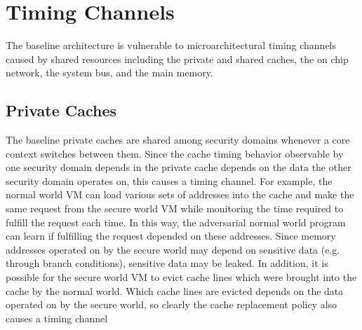 \section{Timing Channels}
The baseline architecture is vulnerable to microarchitectural timing channels 
caused by shared resources including the private and shared caches, the on chip 
network, the system bus, and the main memory.

\subsection{Private Caches}
The baseline private caches are shared among security domains whenever a core 
context switches between them. Since the cache timing behavior observable by 
one security domain depends in the private cache depends on the data the other 
security domain operates on, this causes a timing channel. For example, the 
normal world VM can load various sets of addresses into the cache and make the 
same request from the secure world VM while monitoring the time required to 
fulfill the request each time. In this way, the adversarial normal world 
program can learn if fulfilling the request depended on these addresses. Since 
memory addresses operated on by the secure world may depend on sensitive data 
(e.g. through branch conditions), sensitive data may be leaked. In addition, it 
is possible for the secure world VM to evict cache lines which were brought 
into the cache by the normal world. Which cache lines are evicted depends on 
the data operated on by the secure world, so clearly the cache replacement 
policy also causes a timing channel
